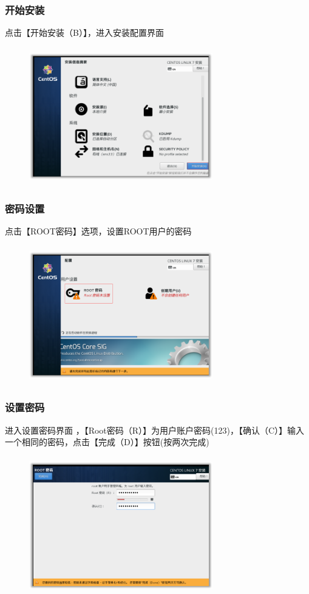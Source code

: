 \documentclass[notheorems,serif]{beamer}
\begin{document}
\begin{frame}
\frametitle{开始安装}
点击【开始安装（B）】，进入安装配置界面
\begin{figure}
 \centering
 \includegraphics[width=8cm,height=6cm]{./figures/图片31.png}
\end{figure}
\end{frame}

\begin{frame}
\frametitle{密码设置}
点击【ROOT密码】选项，设置ROOT用户的密码
\begin{figure}
 \centering
 \includegraphics[width=8cm,height=6cm]{./figures/图片32.png}
\end{figure}
\end{frame}

\begin{frame}
\frametitle{设置密码}
进入设置密码界面 ，【Root密码（R）】为用户账户密码(123)，【确认（C）】输入一个相同的密码，点击【完成（D）】按钮(按两次完成)
\begin{figure}
 \centering
 \includegraphics[width=8cm,height=6cm]{./figures/图片33.png}
\end{figure}
\end{frame}
\end{document}
